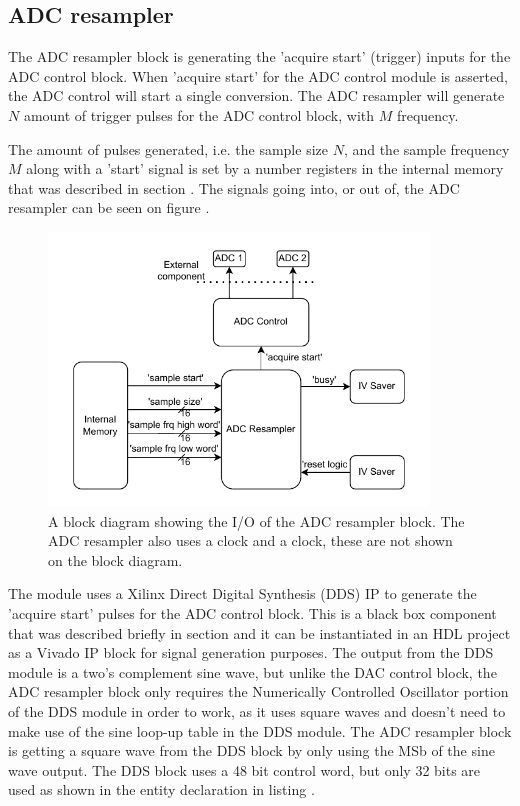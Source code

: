 \subsection{ADC resampler} \label{subsec:ADCResampler}
The ADC resampler block is generating the 'acquire start' (trigger) inputs for the ADC control block. When 'acquire start' for the ADC control module is asserted, the ADC control will start a single conversion. The ADC resampler will generate $N$ amount of trigger pulses for the ADC control block, with $M$ frequency.

The amount of pulses generated, i.e. the sample size $N$, and the sample frequency $M$ along with a 'start' signal is set by a number registers in the internal memory that was described in section . The signals going into, or out of, the ADC resampler can be seen on figure .

\begin{figure}[H]
    \centering
    \includegraphics[clip, trim=0 0 0 0, width=0.9\textwidth]{Sections/7_SystemDesign/Figures/7_2_10_Resample_IO.pdf}
    \caption{A block diagram showing the I/O of the ADC resampler block. The ADC resampler also uses a  clock and a  clock, these are not shown on the block diagram.}
    \label{fig:7_2_10_RESAMPLE_IO}
\end{figure}

The module uses a Xilinx Direct Digital Synthesis (DDS) IP\cite{XILINXDDS} to generate the 'acquire start' pulses for the ADC control block. This is a black box component that was described briefly in section  and it can be instantiated in an HDL project as a Vivado IP block for signal generation purposes. The output from the DDS module is a two's complement sine wave, but unlike the DAC control block, the ADC resampler block only requires the Numerically Controlled Oscillator portion of the DDS module in order to work, as it uses square waves and doesn't need to make use of the sine loop-up table in the DDS module. The ADC resampler block is getting a square wave from the DDS block by only using the MSb of the sine wave output. The DDS block uses a 48 bit control word, but only 32 bits are used as shown in the entity declaration in listing .

